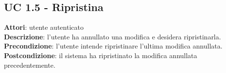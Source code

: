 \subsection{UC 1.5 - Ripristina}{
	\label{uc1.5}
	\textbf{Attori}: utente autenticato \\
	\textbf{Descrizione}: l'utente ha annullato una modifica e desidera ripristinarla. \\
	\textbf{Precondizione}: l'utente intende ripristinare l'ultima modifica annullata.	\\
	\textbf{Postcondizione}: il sistema ha ripristinato la modifica annullata precedentemente.	\\
	}
